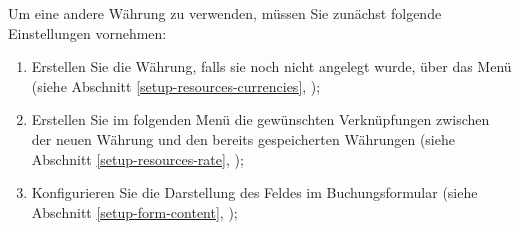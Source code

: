 Um eine andere Währung zu verwenden, müssen Sie zunächst folgende Einstellungen vornehmen:
\begin{enumerate}
	\item Erstellen Sie die Währung, falls sie noch nicht angelegt wurde, über das Menü  (siehe Abschnitt \vref{setup-resources-currencies}, );
	\item Erstellen Sie im folgenden Menü die gewünschten Verknüpfungen zwischen der neuen Währung und den bereits gespeicherten Währungen (siehe Abschnitt \vref{setup-resources-rate}, );
	\item Konfigurieren Sie die Darstellung des Feldes  im Buchungsformular (siehe Abschnitt \vref{setup-form-content}, );
	

\end{enumerate}
